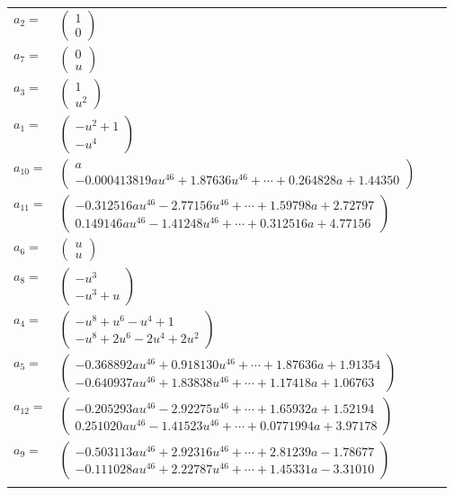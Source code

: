 \documentclass[1p]{elsarticle_modified}
\theoremstyle{definition}
\begin{document}
\begin{tabular}{m{7pt} m{180pt} m{7pt} m{180pt} }
\flushright $a_{2}=$&$\begin{pmatrix}1\\0\end{pmatrix}$ \\
\flushright $a_{7}=$&$\begin{pmatrix}0\\u\end{pmatrix}$ \\
\flushright $a_{3}=$&$\begin{pmatrix}1\\u^2\end{pmatrix}$ \\
\flushright $a_{1}=$&$\begin{pmatrix}- u^2+1\\- u^4\end{pmatrix}$ \\
\flushright $a_{10}=$&$\begin{pmatrix}a\\-0.000413819 a u^{46}+1.87636 u^{46}+\cdots+0.264828 a+1.44350\end{pmatrix}$ \\
\flushright $a_{11}=$&$\begin{pmatrix}-0.312516 a u^{46}-2.77156 u^{46}+\cdots+1.59798 a+2.72797\\0.149146 a u^{46}-1.41248 u^{46}+\cdots+0.312516 a+4.77156\end{pmatrix}$ \\
\flushright $a_{6}=$&$\begin{pmatrix}u\\u\end{pmatrix}$ \\
\flushright $a_{8}=$&$\begin{pmatrix}- u^3\\- u^3+u\end{pmatrix}$ \\
\flushright $a_{4}=$&$\begin{pmatrix}- u^8+u^6- u^4+1\\- u^8+2 u^6-2 u^4+2 u^2\end{pmatrix}$ \\
\flushright $a_{5}=$&$\begin{pmatrix}-0.368892 a u^{46}+0.918130 u^{46}+\cdots+1.87636 a+1.91354\\-0.640937 a u^{46}+1.83838 u^{46}+\cdots+1.17418 a+1.06763\end{pmatrix}$ \\
\flushright $a_{12}=$&$\begin{pmatrix}-0.205293 a u^{46}-2.92275 u^{46}+\cdots+1.65932 a+1.52194\\0.251020 a u^{46}-1.41523 u^{46}+\cdots+0.0771994 a+3.97178\end{pmatrix}$ \\
\flushright $a_{9}=$&$\begin{pmatrix}-0.503113 a u^{46}+2.92316 u^{46}+\cdots+2.81239 a-1.78677\\-0.111028 a u^{46}+2.22787 u^{46}+\cdots+1.45331 a-3.31010\end{pmatrix}$\\&\end{tabular}
\end{document}
